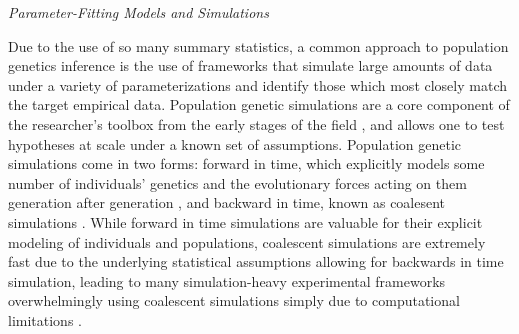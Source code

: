 \noindent \textit{Parameter-Fitting Models and Simulations}

Due to the use of so many summary statistics, a common approach to population genetics inference is the use of frameworks that simulate large amounts of data under a variety of parameterizations and identify those which most closely match the target empirical data. Population genetic simulations are a core component of the researcher’s toolbox from the early stages of the field \cite{tajimaStatisticalMethodTesting1989}, and allows one to test hypotheses at scale under a known set of assumptions. Population genetic simulations come in two forms: forward in time, which explicitly models some number of individuals’ genetics and the evolutionary forces acting on them generation after generation \cite{hallerSLiMForwardGenetic2019}, and backward in time, known as coalesent simulations \cite{kernDiscoalFlexibleCoalescent2016, kelleherEfficientCoalescentSimulation2016, excoffierFastsimcoal2DemographicInference2021}. While forward in time simulations are valuable for their explicit modeling of individuals and populations, coalescent simulations are extremely fast due to the underlying statistical assumptions allowing for backwards in time simulation, leading to many simulation-heavy experimental frameworks overwhelmingly using coalescent simulations simply due to computational limitations \cite{marthAlleleFrequencySpectrum2004, liInferenceHumanPopulation2011}.

